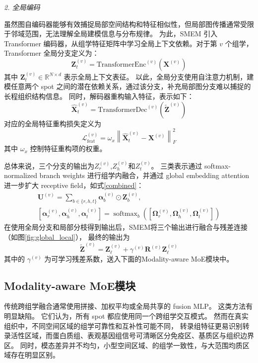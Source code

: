 \documentclass[journal]{IEEEtran}
\begin{document}
\textit{2. 全局编码}

虽然图自编码器能够有效捕捉局部空间结构和特征相似性，但局部图传播通常受限于邻域范围，无法理解全局建模信息与分布规律。
为此，SMEM 引入 Transformer 编码器，从组学特征矩阵中学习全局上下文依赖。对于第 $v$ 个组学，Transformer 全局分支定义为：
\begin{equation}
\mathbf{Z}_{t}^{(v)}
=
\mathrm{TransformerEnc}^{(v)}
\left(
\mathbf{X}^{(v)}
\right)
\end{equation}
其中 $\mathbf{Z}_{t}^{(v)}\in\mathbb{R}^{N\times d}$ 表示全局上下文表征。
以此，全局分支使用自注意力机制，建模任意两个 spot 之间的潜在依赖关系，通过该分支，补充局部图分支难以捕捉的长程组织结构信息。
同时，解码器重构输入特征，表示如下：
\begin{equation}
\widehat{\mathbf{X}}_{t}^{(v)}
=
\mathrm{TransformerDec}^{(v)}
\left(
\widetilde{\mathbf{Z}}^{(v)}
\right)
\end{equation}
对应的全局特征重构损失定义为
\begin{equation}
\mathcal{L}_{\mathrm{feat}}^{(v)}
=
\omega_x
\left\|
\widehat{\mathbf{X}}_{t}^{(v)}
-
\mathbf{X}^{(v)}
\right\|_F^2
\end{equation}
其中 $\omega_x$ 控制特征重构项的权重。

总体来说，三个分支的输出为${Z}_{r}^{(v)}$,${Z}_{h}^{(v)}$和${Z}_{t}^{(v)}$。
三类表示通过 softmax-normalized branch weights 进行组学内融合，并通过 global embedding attention 进一步扩大 receptive field，如式\ref{combined}：
\begin{equation}
    \label{combined}
    \begin{aligned}
        \mathbf{U}^{(v)}=
\sum_{b\in\{r,h,t\}}\boldsymbol{\alpha}_{b}^{(v)}\odot\mathbf{Z}_{b}^{(v)},\\
[\boldsymbol{\alpha}_{r}^{(v)},\boldsymbol{\alpha}_{h}^{(v)},\boldsymbol{\alpha}_{t}^{(v)}]
=\operatorname{softmax}_{b}([\boldsymbol{\Omega}_{r}^{(v)},\boldsymbol{\Omega}_{h}^{(v)},\boldsymbol{\Omega}_{t}^{(v)}])
    \end{aligned}
\end{equation}
在使用全局分支和局部分枝得到输出后，SMEM将三个输出进行融合与残差连接（如图\ref{fig:global_local}），
最终的输出为
\begin{equation}
\widetilde{\mathbf{Z}}^{(v)}
=
\mathbf{Z}_{\ell}^{(v)}
+
\gamma^{(v)}
\mathbf{R}^{(v)}
\mathbf{Z}_{\ell}^{(v)}
\end{equation}
其中的 $\gamma^{(v)}$ 为可学习残差系数，送入下面的Modality-aware MoE模块中。

\subsection{Modality-aware MoE模块}
传统跨组学融合通常使用拼接、加权平均或全局共享的 fusion MLP。
这类方法有明显缺陷。
它们认为，所有 spot 都应使用同一个跨组学交互模式。
然而在真实组织中，不同空间区域的组学可靠性和互补性可能不同，
转录组特征更易识别转录活性区域，而蛋白质组、表观基因组信号可清晰区分免疫区、基质区与组织边界区。
同时，模态差异并不均匀，小型空间区域、的组学一致性，与大范围均质区域存在明显区别。
\end{document}
